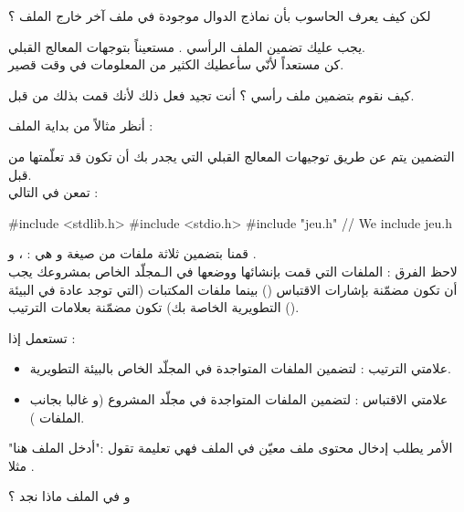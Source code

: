 \begin{question}
  لكن كيف يعرف الحاسوب بأن نماذج الدوال موجودة في ملف آخر خارج الملف
؟
\end{question}

يجب عليك تضمين الملف الرأسي
.
مستعيناً بتوجهات المعالج القبلي.\\
كن مستعداً لأنّي سأعطيك الكثير من المعلومات في وقت قصير.

كيف نقوم بتضمين ملف رأسي ؟ أنت تجيد فعل ذلك لأنك قمت بذلك من قبل.

أنظر مثالاً من بداية الملف
 :

\begin{Csource}
#include <stdlib.h>
#include <stdio.h>
#include "jeu.h"
void play(SDL_Surface* screen)
{
// ...
\end{Csource}

التضمين يتم عن طريق توجيهات المعالج القبلي
التي يجدر بك أن تكون قد تعلّمتها من قبل.\\
تمعن في التالي :

\begin{Csource}
#include <stdlib.h>
#include <stdio.h>
#include "jeu.h" // We include jeu.h
\end{Csource}

قمنا بتضمين ثلاثة ملفات من صيغة
و هي :
،  و .\\
لاحظ الفرق : الملفات التي قمت بإنشائها ووضعها في الـمجلّد الخاص بمشروعك يجب أن تكون مضمّنة بإشارات الاقتباس
()
بينما ملفات المكتبات (التي توجد عادة في البيئة التطويرية الخاصة بك) تكون مضمّنة بعلامات الترتيب
().

تستعمل إذا :

\begin{itemize}
  \item علامتي الترتيب
\InlineCode{< >}
: لتضمين الملفات المتواجدة في المجلّد
الخاص بالبيئة التطويرية.
  \item علامتي الاقتباس
 : لتضمين  الملفات المتواجدة في مجلّد المشروع (و غالبا بجانب الملفات
).
\end{itemize}

الأمر
يطلب إدخال محتوى ملف معيّن في الملف
فهي تعليمة تقول :"أدخل الملف
هنا" مثلا .

\begin{question}
  و في الملف
ماذا نجد ؟
\end{question}

